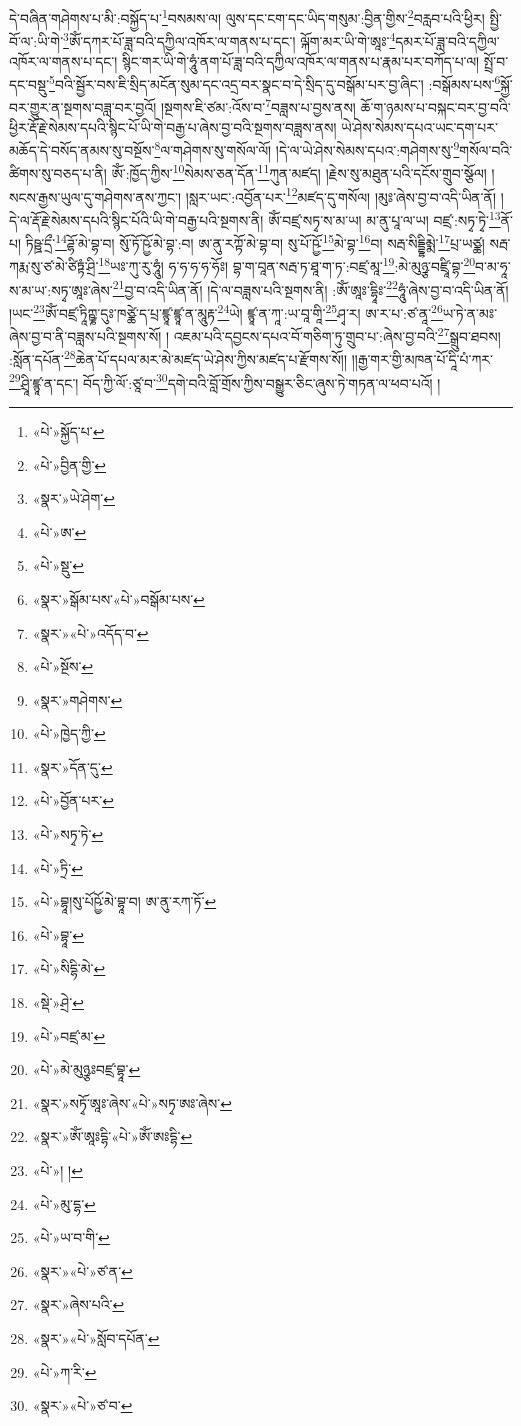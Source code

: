 དེ་བཞིན་གཤེགས་པ་མི་:བསྐྱོད་པ་\footnote{«པེ་»སྐྱོད་པ་}བསམས་ལ། ལུས་དང་ངག་དང་ཡིད་གསུམ་:བྱིན་གྱིས་\footnote{«པེ་»བྱིན་གྱི་}བརླབ་པའི་ཕྱིར། སྤྱི་བོ་ལ་:ཡི་གེ་\footnote{«སྣར་»ཡེ་ཤེག་}ཨོཾ་དཀར་པོ་ཟླ་བའི་དཀྱིལ་འཁོར་ལ་གནས་པ་དང་། ལྐོག་མར་ཡི་གེ་ཨཱཿ་\footnote{«པེ་»ཨ་}དམར་པོ་ཟླ་བའི་དཀྱིལ་འཁོར་ལ་གནས་པ་དང་། སྙིང་གར་ཡི་གེ་ཧཱུཾ་ནག་པོ་ཟླ་བའི་དཀྱིལ་འཁོར་ལ་གནས་པ་རྣམ་པར་བཀོད་པ་ལ། སྤྲོ་བ་དང་བསྡུ་\footnote{«པེ་»སྡུ་}བའི་སྦྱོར་བས་ཇི་སྲིད་མངོན་སུམ་དང་འདྲ་བར་སྣང་བ་དེ་སྲིད་དུ་བསྒོམ་པར་བྱ་ཞིང་། :བསྒོམས་པས་\footnote{«སྣར་»སྒོམ་པས་«པེ་»བསྒོམ་པས་}སྐྱོ་བར་གྱུར་ན་སྔགས་བཟླ་བར་བྱའོ། །སྔགས་ཇི་ཙམ་:འོས་བ་\footnote{«སྣར་»«པེ་»འདོད་བ་}བཟླས་པ་བྱས་ནས། ཆོ་ག་ཉམས་པ་བསྐང་བར་བྱ་བའི་ཕྱིར་རྡོ་རྗེ་སེམས་དཔའི་སྙིང་པོ་ཡི་གེ་བརྒྱ་པ་ཞེས་བྱ་བའི་སྔགས་བཟླས་ནས། ཡེ་ཤེས་སེམས་དཔའ་ཡང་དག་པར་མཆོད་དེ་བསོད་ནམས་སུ་བསྔོས་\footnote{«པེ་»སྔོས་}ལ་གཤེགས་སུ་གསོལ་ལོ། །དེ་ལ་ཡེ་ཤེས་སེམས་དཔའ་:གཤེགས་སུ་\footnote{«སྣར་»གཤེགས་}གསོལ་བའི་ཚིགས་སུ་བཅད་པ་ནི། ཨོཾ་:ཁྱོད་ཀྱིས་\footnote{«པེ་»ཁྱེད་ཀྱི་}སེམས་ཅན་དོན་\footnote{«སྣར་»དོན་དུ་}ཀུན་མཛད། །རྗེས་སུ་མཐུན་པའི་དངོས་གྲུབ་སྩོལ། །སངས་རྒྱས་ཡུལ་དུ་གཤེགས་ནས་ཀྱང་། །སླར་ཡང་:འབྱོན་པར་\footnote{«པེ་»བྱོན་པར་}མཛད་དུ་གསོལ། །མུཿ་ཞེས་བྱ་བ་འདི་ཡིན་ནོ། །དེ་ལ་རྡོ་རྗེ་སེམས་དཔའི་སྙིང་པོའི་ཡི་གེ་བརྒྱ་པའི་སྔགས་ནི། ཨོཾ་བཛྲ་སཏྭ་ས་མ་ཡ། མ་ནུ་པཱ་ལ་ཡ། བཛྲ་:སཏྭ་ཏྭེ་\footnote{«པེ་»སཏྭ་ཏེ་}ནོ་པ། ཏིཥྛ་དྲྀ་\footnote{«པེ་»ཏྲི་}ཌྷོ་མེ་བྷ་བ། སོུ་ཏོ་ཥྱོ་མེ་བྷ་:བ། ཨ་ནུ་རཀྟོ་མེ་བྷ་བ། སུ་པོ་ཥྱོ་\footnote{«པེ་»བྷཱ།སུ་པོཥྱོ་མེ་བྷཱ་བ། ཨ་ནུ་རཀ་ཏོ་}མེ་བྷ་\footnote{«པེ་»བྷཱ་}བ། སརྦ་སིདྡྷིམྨེ་\footnote{«པེ་»སིདྷི་མེ་}པྲ་ཡཙྪ། སརྦ་ཀརྨ་སུ་ཙ་མེ་ཙིཏྟཾ་ཤྲི་\footnote{«སྡེ་»ཤྲེ་}ཡཿ་ཀུ་རུ་ཧཱུཾ། ཧ་ཧ་ཧ་ཧ་ཧོཿ། བྷ་ག་བཱན་སརྦ་ཏ་ཐཱ་ག་ཏ་:བཛྲ་མཱ་\footnote{«པེ་»བཛྲ་མ་}:མེ་མུཉྩ་བཛྲཱི་བྷ་\footnote{«པེ་»མེ་མུཉྩཿབཛྲ་བྷཱ་}བ་མ་ཧཱ་ས་མ་ཡ་:སཏྭ་ཨཱཿ་ཞེས་\footnote{«སྣར་»སཏྭོ་ཨཱཿ་ཞེས་«པེ་»སཏྭ་ཨཿ་ཞེས་}བྱ་བ་འདི་ཡིན་ནོ། །དེ་ལ་བཟླས་པའི་སྔགས་ནི། :ཨོཾ་ཨཱཿ་དྷཱིཿ་\footnote{«སྣར་»ཨོཾ་ཨཱཿདྷི་«པེ་»ཨོཾ་ཨཿདྷི་}ཧཱུཾ་ཞེས་བྱ་བ་འདི་ཡིན་ནོ། །ཡང་\footnote{«པེ་»། །}ཨོཾ་བཛྲ་ཏཱིཀྵྞ་དུཿ་ཁཙྪེ་ད་པྲ་ཛྙཱ་ཛྙཱ་ན་མཱུརྟ་\footnote{«པེ་»མུ་དྷ་}ཡེ། ཛྙཱ་ན་ཀཱ་:ཡ་བཱ་གཱི་\footnote{«པེ་»ཡ་བ་གི་}ཤྭ་ར། ཨ་ར་པ་:ཙ་ནཱ་\footnote{«སྣར་»«པེ་»ཙ་ན་}ཡ་ཏེ་ན་མཿ་ཞེས་བྱ་བ་ནི་བཟླས་པའི་སྔགས་སོ། །
འཇམ་པའི་དབྱངས་དཔའ་བོ་གཅིག་ཏུ་གྲུབ་པ་:ཞེས་བྱ་བའི་\footnote{«སྣར་»ཞེས་པའི་}སྒྲུབ་ཐབས། :སློན་དཔོན་\footnote{«སྣར་»«པེ་»སློབ་དཔོན་}ཆེན་པོ་དཔལ་མར་མེ་མཛད་ཡེ་ཤེས་ཀྱིས་མཛད་པ་རྫོགས་སོ།། །།རྒྱ་གར་གྱི་མཁན་པོ་དཱི་པཾ་ཀར་\footnote{«པེ་»ཀ་རི་}ཤྲཱི་ཛྙཱ་ན་དང་། བོད་ཀྱི་ལོ་:ཙཱ་བ་\footnote{«སྣར་»«པེ་»ཙ་བ་}དགེ་བའི་བློ་གྲོས་ཀྱིས་བསྒྱུར་ཅིང་ཞུས་ཏེ་གཏན་ལ་ཕབ་པའོ། ། 